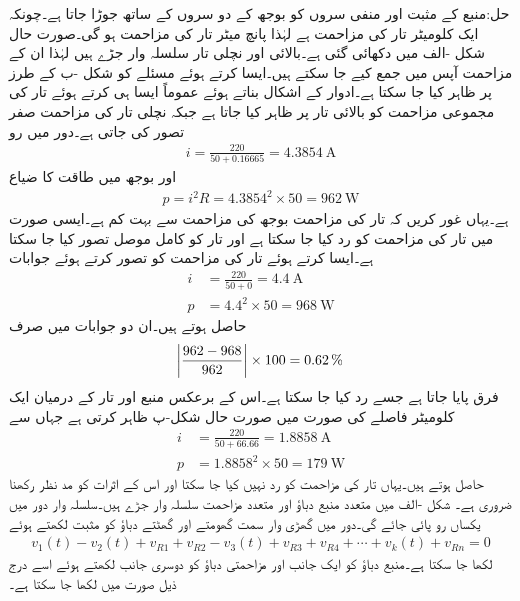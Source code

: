 حل:منبع کے مثبت اور منفی سروں کو بوجھ کے دو سروں کے ساتھ جوڑا جاتا ہے۔چونکہ ایک کلومیٹر تار کی مزاحمت  ہے لہٰذا پانچ میٹر تار کی مزاحمت  ہو گی۔صورت حال شکل -الف میں دکھائی گئی ہے۔بالائی اور نچلی تار سلسلہ وار جڑے ہیں لہٰذا ان کے مزاحمت آپس میں جمع کیے جا سکتے ہیں۔ایسا کرتے ہوئے مسئلے کو شکل  -ب کے طرز پر ظاہر کیا جا سکتا ہے۔ادوار کے اشکال بناتے ہوئے عموماً ایسا ہی کرتے ہوئے تار کی مجموعی مزاحمت کو بالائی تار پر ظاہر کیا جاتا ہے جبکہ نچلی تار کی مزاحمت صفر تصور کی جاتی ہے۔دور میں رو
\begin{align*}
i=\frac{220}{50+0.16665}=\SI{4.3854}{\ampere}
\end{align*}
اور  بوجھ میں طاقت کا ضیاع
\begin{align*}
p=i^2 R=4.3854^2 \times 50=\SI{962}{\watt}
\end{align*}
ہے۔یہاں غور کریں کہ تار کی مزاحمت بوجھ کی مزاحمت سے بہت کم ہے۔ایسی صورت میں تار کی مزاحمت کو رد کیا جا سکتا ہے اور تار کو کامل موصل تصور کیا جا سکتا ہے۔ایسا کرتے ہوئے تار کی مزاحمت کو  تصور کرتے ہوئے جوابات
\begin{align*}
i&=\frac{220}{50+0}=\SI{4.4}{\ampere}\\
p&=4.4^2 \times 50=\SI{968}{\watt}
\end{align*}
حاصل ہوتے ہیں۔ان دو جوابات میں صرف
\begin{align*}
\abs{\frac{962-968}{962}}\times 100=\SI{0.62}{\percent}
\end{align*}
فرق پایا جاتا ہے جسے رد کیا جا سکتا ہے۔اس کے برعکس منبع اور تار کے درمیان ایک کلومیٹر فاصلے کی صورت میں صورت حال شکل-پ ظاہر کرتی ہے جہاں سے
\begin{align*}
i&=\frac{220}{50+66.66}=\SI{1.8858}{\ampere}\\
p&=1.8858^2 \times 50=\SI{179}{\watt}
\end{align*}
حاصل ہوتے ہیں۔یہاں تار کی مزاحمت کو رد نہیں کیا جا سکتا اور اس کے اثرات کو مد نظر رکھنا ضروری ہے۔
شکل -الف میں متعدد منبع دباؤ اور متعدد مزاحمت سلسلہ وار جڑے ہیں۔سلسلہ وار دور میں یکساں رو  پائی جائے گی۔دور میں گھڑی وار سمت گھومتے اور گھٹتے دباؤ کو مثبت لکھتے ہوئے
\begin{align}
v_1(t)-v_2(t)+v_{R1}+v_{R2}-v_3(t)+v_{R3}+v_{R4}+\cdots+v_k(t)+v_{Rn}=0
\end{align}
لکھا جا سکتا ہے۔منبع دباؤ کو ایک جانب اور مزاحمتی دباؤ کو دوسری جانب لکھتے ہوئے اسے درج ذیل صورت میں لکھا جا سکتا ہے۔
